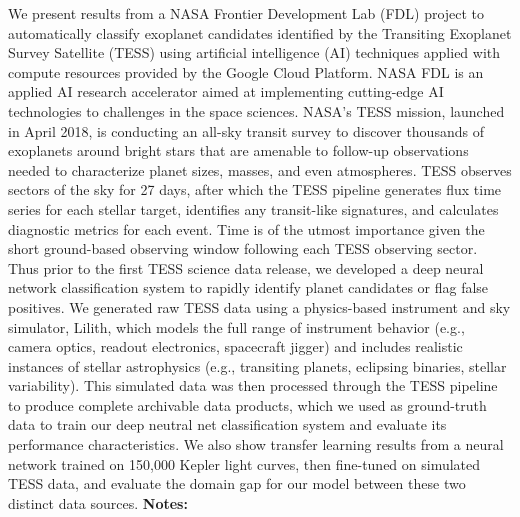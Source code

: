 \documentclass{report}
\begin{document}
{{{{{{{{We present results from a NASA Frontier Development Lab (FDL) project to automatically classify exoplanet candidates identified by the Transiting Exoplanet Survey Satellite (TESS) using artificial intelligence (AI) techniques applied with compute resources provided by the Google Cloud Platform. NASA FDL is an applied AI research accelerator aimed at implementing cutting-edge AI technologies to challenges in the space sciences. NASA's TESS mission, launched in April 2018, is conducting an all-sky transit survey to discover thousands of exoplanets around bright stars that are amenable to follow-up observations needed to characterize planet sizes, masses, and even atmospheres. TESS observes sectors of the sky for 27 days, after which the TESS pipeline generates flux time series for each stellar target, identifies any transit-like signatures, and calculates diagnostic metrics for each event. Time is of the utmost importance given the short ground-based observing window following each TESS observing sector. Thus prior to the first TESS science data release, we developed a deep neural network classification system to rapidly identify planet candidates or flag false positives. We generated raw TESS data using a physics-based instrument and sky simulator, Lilith, which models the full range of instrument behavior (e.g., camera optics, readout electronics, spacecraft jigger) and includes realistic instances of stellar astrophysics (e.g., transiting planets, eclipsing binaries, stellar variability). This simulated data was then processed through the TESS pipeline to produce complete archivable data products, which we used as ground-truth data to train our deep neutral net classification system and evaluate its performance characteristics. We also show transfer learning results from a neural network trained on 150,000 Kepler light curves, then fine-tuned on simulated TESS data, and evaluate the domain gap for our model between these two distinct data sources.\newline
{\bf Notes:}\newline
{\newpage
}}}}}}}}}
\end{document}
